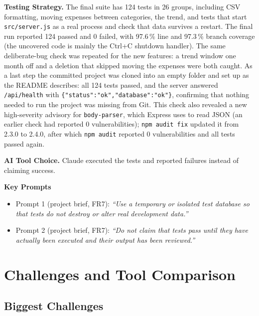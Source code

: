 \documentclass[11pt,a4paper]{article}
\newcommand{\prompt}[1]{\textit{``#1''}}
\begin{document}
\textbf{Testing Strategy.} The final suite has 124 tests in 26 groups,
including CSV formatting, moving expenses between categories, the trend,
and tests that start \texttt{src/server.js} as a real process and check
that data survives a restart. The final run reported 124 passed and 0
failed, with 97.6\,\% line and 97.3\,\% branch coverage (the uncovered
code is mainly the Ctrl+C shutdown handler). The same deliberate-bug
check was repeated for the new features: a trend window one month off and
a deletion that skipped moving the expenses were both caught. As a last
step the committed project was cloned into an empty folder and set up as
the README describes: all 124 tests passed, and the server answered
\texttt{/api/health} with \texttt{\{"status":"ok","database":"ok"\}},
confirming that nothing needed to run the project was missing from Git.
This check also revealed a new high-severity advisory for
\texttt{body-parser}, which Express uses to read JSON (an earlier check
had reported 0 vulnerabilities); \texttt{npm audit fix} updated it from
2.3.0 to 2.4.0, after which \texttt{npm audit} reported 0 vulnerabilities
and all tests passed again.

\textbf{AI Tool Choice.} Claude executed the tests and reported failures
instead of claiming success.

\textbf{Key Prompts}
\begin{itemize}
    \item Prompt 1 (project brief, FR7): \prompt{Use a temporary or isolated test database so that tests do not destroy or alter real development data.}
    \item Prompt 2 (project brief, FR7): \prompt{Do not claim that tests pass until they have actually been executed and their output has been reviewed.}
\end{itemize}


\section{Challenges and Tool Comparison}

\subsection{Biggest Challenges}
\end{document}
